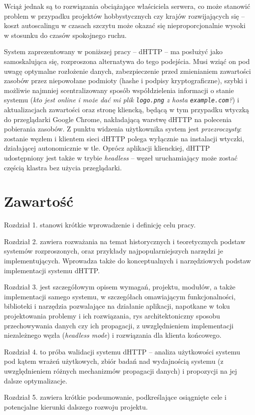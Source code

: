 Wciąż jednak są to rozwiązania obciążające właściciela serwera, co może stanowić problem w przypadku projektów hobbystycznych czy krajów rozwijających się -- koszt autoscalingu w czasach szczytu może okazać się nieproporcjonalnie wysoki w stosunku do czasów spokojnego ruchu.


System zaprezentowany w poniższej pracy -- dHTTP -- ma posłużyć jako samoskalująca się, rozproszona alternatywa do tego podejścia. Musi wziąć on pod uwagę optymalne rozłożenie danych, zabezpieczenie przed zmienianiem zawartości zasobów przez niepowołane podmioty (hashe i podpisy kryptograficzne), szybki i możliwie najmniej scentralizowany sposób współdzielenia informacji o stanie systemu ({\em kto jest online i może dać mi plik \texttt{logo.png} z hosta \texttt{example.com}?}) i aktualizacjach zawartości oraz stronę kliencką, będącą w tym przypadku wtyczką do przeglądarki Google Chrome, nakładającą warstwę dHTTP na polecenia pobierania zasobów. Z punktu widzenia użytkownika system jest {\em przezroczysty}: zostanie  węzłem i klientem sieci dHTTP polega wyłącznie na instalacji wtyczki, działającej autonomicznie w tle. Oprócz aplikacji klienckiej, dHTTP udostępniony jest także w trybie {\em headless} -- węzeł uruchamiający może zostać częścią klastra bez użycia przeglądarki.

\section{Zawartość}
\label{sec:zawartosc}

Rozdział 1. stanowi krótkie wprowadzenie i definicję celu pracy. 

Rozdział 2. zawiera rozważania na temat historycznych i teoretycznych podstaw systemów rozproszonych, oraz przykłady najpopularniejszych narzędzi je implementujących. Wprowadza także do konceptualnych i narzędziowych podstaw implementacji systemu dHTTP. 

Rozdział 3. jest szczegółowym opisem wymagań, projektu, modułów, a także implementacji samego systemu, w szczegółach omawiającym funkcjonalności, biblioteki i narzędzia pozwalające na działanie aplikacji, napotkane w toku projektowania problemy i ich rozwiązania, rys architektoniczny sposobu przechowywania danych czy ich propagacji, z uwzględnieniem implementacji niezależnego węzła ({\em headless mode}) i rozwiązania dla klienta końcowego.

Rozdział 4. to próba walidacji systemu dHTTP – analiza użytkowości systemu pod kątem wrażeń użytkowych, zbiór badań nad wydajnością systemu (z uwzględnieniem różnych mechanizmów propagacji danych) i propozycji na jej dalsze optymalizacje.

Rozdział 5. zawiera krótkie podsumowanie, podkreślające osiągnięte cele i potencjalne kierunki dalszego rozwoju projektu.

